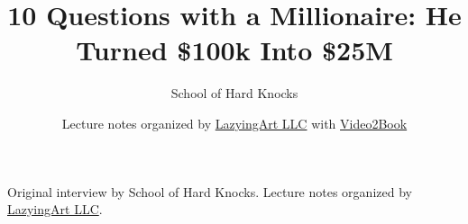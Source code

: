\documentclass[11pt,oneside]{book}
\begin{document}
\frontmatter
\title{10 Questions with a Millionaire: He Turned \$100k Into \$25M}
\author{School of Hard Knocks}
\date{Lecture notes organized by \href{https://lazying.art}{LazyingArt LLC} with \href{https://github.com/lachlanchen/Video2Book}{Video2Book}}
\maketitle
\begin{center}
\small Original interview by School of Hard Knocks. Lecture notes organized by \href{https://lazying.art}{LazyingArt LLC}.
\end{center}
\clearpage
\mainmatter

\end{document}
